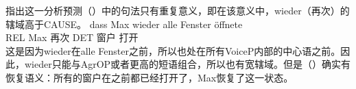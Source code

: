 
\citet{JB2003a-u}指出这一分析预测（）中的句法只有重复意义，即在该意义中，wieder（再次）的辖域高于CAUSE。
\ea
\label{ex-wieder-alle}
\gll dass Max wieder alle Fenster öffnete\\
    REL Max 再次 DET 窗户 打开\\
\z
这是因为wieder在alle Fenster之前，所以也处在所有VoiceP内部的中心语之前。因此，wieder只能与AgrOP或者更高的短语组合，所以也有宽辖域。但是（）确实有恢复语义：所有的窗户在之前都已经打开了，Max恢复了这一状态。

